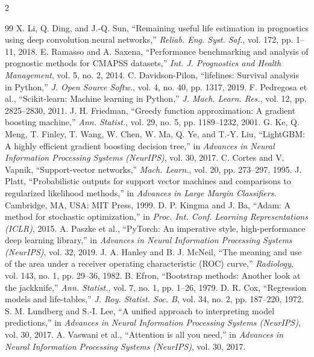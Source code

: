 \begin{multicols}{2}
\begin{thebibliography}{99}
 X. Li, Q. Ding, and J.-Q. Sun, ``Remaining useful life estimation in prognostics using deep convolution neural networks,'' \emph{Reliab. Eng. Syst. Saf.}, vol. 172, pp. 1–11, 2018.
 E. Ramasso and A. Saxena, ``Performance benchmarking and analysis of prognostic methods for CMAPSS datasets,'' \emph{Int. J. Prognostics and Health Management}, vol. 5, no. 2, 2014.
 C. Davidson-Pilon, ``lifelines: Survival analysis in Python,'' \emph{J. Open Source Softw.}, vol. 4, no. 40, pp. 1317, 2019.
 F. Pedregosa et al., ``Scikit-learn: Machine learning in Python,'' \emph{J. Mach. Learn. Res.}, vol. 12, pp. 2825–2830, 2011.
 J. H. Friedman, ``Greedy function approximation: A gradient boosting machine,'' \emph{Ann. Statist.}, vol. 29, no. 5, pp. 1189–1232, 2001.
 G. Ke, Q. Meng, T. Finley, T. Wang, W. Chen, W. Ma, Q. Ye, and T.-Y. Liu, ``LightGBM: A highly efficient gradient boosting decision tree,'' in \emph{Advances in Neural Information Processing Systems (NeurIPS)}, vol. 30, 2017.
 C. Cortes and V. Vapnik, ``Support-vector networks,'' \emph{Mach. Learn.}, vol. 20, pp. 273–297, 1995.
 J. Platt, ``Probabilistic outputs for support vector machines and comparisons to regularized likelihood methods,'' in \emph{Advances in Large Margin Classifiers}. Cambridge, MA, USA: MIT Press, 1999.
 D. P. Kingma and J. Ba, ``Adam: A method for stochastic optimization,'' in \emph{Proc. Int. Conf. Learning Representations (ICLR)}, 2015.
 A. Paszke et al., ``PyTorch: An imperative style, high-performance deep learning library,'' in \emph{Advances in Neural Information Processing Systems (NeurIPS)}, vol. 32, 2019.
 J. A. Hanley and B. J. McNeil, ``The meaning and use of the area under a receiver operating characteristic (ROC) curve,'' \emph{Radiology}, vol. 143, no. 1, pp. 29–36, 1982.
 B. Efron, ``Bootstrap methods: Another look at the jackknife,'' \emph{Ann. Statist.}, vol. 7, no. 1, pp. 1–26, 1979.
 D. R. Cox, ``Regression models and life-tables,'' \emph{J. Roy. Statist. Soc. B}, vol. 34, no. 2, pp. 187–220, 1972.
 S. M. Lundberg and S.-I. Lee, ``A unified approach to interpreting model predictions,'' in \emph{Advances in Neural Information Processing Systems (NeurIPS)}, vol. 30, 2017.
 A. Vaswani et al., ``Attention is all you need,'' in \emph{Advances in Neural Information Processing Systems (NeurIPS)}, vol. 30, 2017.

\end{thebibliography}
\end{multicols}
